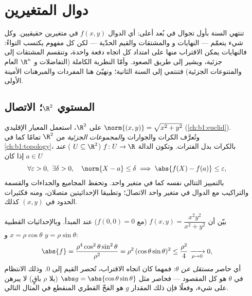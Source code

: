 \chapter{دوال المتغيرين}\label{ch:b1:multivar}

تنتهي السنة بأول تجوال في بُعد أعلى: أي الدوال
$f(x, y)$ في متغيرين حقيقيين. وكل شيء يتعمّم --- النهايات و
 والمشتقات والقيم الحدّية --- لكن كل مفهوم يكتسب التواءً:
فالنهايات يمكن الاقتراب منها على امتداد كل اتجاه دفعة واحدة، وتنقسم المشتقات
إلى جزئية، ويشير  إلى طريق الصعود. وأمّا النظرية
الكاملة (التفاضلات و $\R^n$ العام والمتنوعات الجزئية) فتنتمي إلى
السنة الثانية؛ ونهيّئ هنا المفردات والمبرهنات الأمينة
الأولى.

\section{المستوي $\R^2$؛ الاتصال}

\begin{definition}\label{def:b1:multivar:topology}
على $\R^2$، استعمل المعيار الإقليدي $\norm{(x,y)} = \sqrt{x^2 + y^2}$
(\cref{ch:b1:euclid}). وتُعرَّف الكرات  والجوارات و\emph{المجموعات
الجزئية } من $\R^2$ تمامًا كما في
\cref{ch:b1:topology}، بالكرات بدل الفترات. وتكون الدالة
$f \colon U \to \R$ ($U \subseteq \R^2$ ) \emph{
عند} $a \in U$ إذا كان
\[
\forall\varepsilon > 0,\ \exists\delta > 0, \quad
\norm{X - a} \leq \delta \implies \abs{f(X) - f(a)} \leq
\varepsilon,
\]
بالتمييز التتالي نفسه كما في متغير واحد.
وتحفظ المجاميع والجداءات والقسمة والتراكيب مع الدوال  في
متغير واحد الاتصالَ؛ وتطبيقا الإحداثيتين
متصلان، ومنه فكثيرات الحدود في $(x,y)$ كذلك.
\end{definition}

\begin{example}
\label{ex:b1:multivar:polarbound}
بيّن أن $f(x, y) = \dfrac{x^2y^2}{x^2 + y^2}$ (مع $f(0,0) =
0$)  عند المبدأ. وبالإحداثيات القطبية $x =
\rho\cos\theta$ و $y = \rho\sin\theta$:
\[
\abs{f} = \frac{\rho^4\cos^2\theta\sin^2\theta}{\rho^2}
= \rho^2\,(\cos\theta\sin\theta)^2 \leq \frac{\rho^2}{4}
\xrightarrow[\rho \to 0]{} 0 ,
\]
أي حاصر \emph{مستقل عن $\theta$}: فمهما كان اتجاه
الاقتراب، تُحصر القيم إلى $0$. وذلك الانتظام في
$\theta$ هو كل المقصود --- فحاصر مثل $\abs g =
\abs{\cos\theta\sin\theta}$ (بلا $\rho$ باقٍ) لا يبرهن على شيء،
وفعلًا فإن ذلك المقدار $g$ هو الفخّ القطري المنقطع في
المثال التالي.
\end{example}

